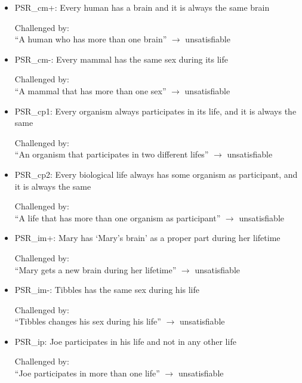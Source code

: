 \begin{itemize}

\item PSR\_cm+: Every human has a brain and it is always the same brain

Challenged by: \\``A human who has more than one brain''  $\rightarrow$ unsatisfiable



\item PSR\_cm-: Every mammal has the same sex during its life

Challenged by: \\``A mammal that has more than one sex''  $\rightarrow$ unsatisfiable

 
\item PSR\_cp1: Every organism always participates in its life, and it is always the same

Challenged by: \\``An  organism that participates in two different lifes''  $\rightarrow$ unsatisfiable


\item PSR\_cp2: Every biological life always has some organism as participant, and it is always the same

Challenged by: \\``A life that has more than one organism as participant''  $\rightarrow$ unsatisfiable


\item PSR\_im+: Mary has `Mary's brain' as a proper part during her lifetime 

Challenged by: \\``Mary gets a new brain during her lifetime''  $\rightarrow$ unsatisfiable


\item PSR\_im-: Tibbles has the same sex during his life 

Challenged by: \\``Tibbles changes his sex during his life''  $\rightarrow$ unsatisfiable


\item PSR\_ip: Joe participates in his life and not in any other life

Challenged by: \\``Joe participates in more than one life''  $\rightarrow$ unsatisfiable



\end{itemize}
